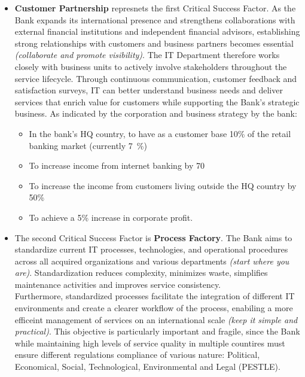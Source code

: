 \begin{itemize}
    \item \textbf{Customer Partnership} represnets the first Critical Success Factor. As the Bank expands its international presence and strengthens collaborations with external financial institutions and independent financial advisors, establishing strong relationships with customers and business partners becomes essential \textit{(collaborate and promote visibility)}. The IT Department therefore works closely with business units to actively involve stakeholders throughout the service lifecycle. Through continuous communication, customer feedback and satisfaction surveys, IT can better understand business needs and deliver services that enrich value for customers while supporting the Bank's strategic business.
    As indicated by the corporation and business strategy by the bank:
    \begin{itemize}
        \item In the bank's HQ country, to have as a customer base 10\% of the retail banking market (currently 7~\%)
        \item To increase income from internet banking by 70%
        \item  To increase the income from customers living outside the HQ country by 50\%
        \item To achieve a 5\% increase in corporate profit.
    \end{itemize}

    \item The second Critical Success Factor is \textbf{Process Factory}. The Bank aims to standardize current IT processes, technologies, and operational procedures across all acquired organizations and various departments \textit{(start where you are)}. Standardization reduces complexity, minimizes waste, simplifies maintenance activities and improves service consistency. \\
    Furthermore, standardized processes facilitate the integration of different IT environments and create a clearer workflow of the process, enabiling a more efficeint management of services on an international scale \textit{(keep it simple and practical)}. 
    This objective is particularly important and fragile, since the Bank while maintaining high levels of service quality in multiple countires must ensure different regulations compliance of various nature: Political, Economical, Social, Technological, Environmental and Legal (PESTLE). 
    

\end{itemize}
